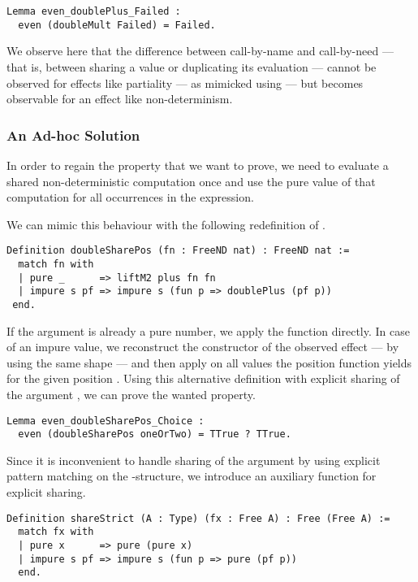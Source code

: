 \begin{verbatim}
Lemma even_doublePlus_Failed :
  even (doubleMult Failed) = Failed.
\end{verbatim}

We observe here that the difference between call\--by\--name and call\--by\--need --- that is, between sharing a value or duplicating its evaluation --- cannot be observed for effects like partiality --- as mimicked using  --- but becomes observable for an effect like non\--determinism.

\subsubsection{An Ad\--hoc Solution}
\label{subsubsec:adhoc}

In order to regain the property that we want to prove, we need to evaluate a shared non\--deterministic computation once and use the pure value of that computation for all occurrences in the expression.

We can mimic this behaviour with the following redefinition of .

\begin{verbatim}
Definition doubleSharePos (fn : FreeND nat) : FreeND nat :=
  match fn with
  | pure _      => liftM2 plus fn fn
  | impure s pf => impure s (fun p => doublePlus (pf p))
 end.
\end{verbatim}

If the argument  is already a pure number, we apply the function  directly.
In case of an impure value, we reconstruct the constructor of the observed effect --- by using the same shape  --- and then apply  on all values the position function  yields for the given position .
Using this alternative definition with explicit sharing of the argument , we can prove the wanted property.

\begin{verbatim}
Lemma even_doubleSharePos_Choice :
  even (doubleSharePos oneOrTwo) = TTrue ? TTrue.
\end{verbatim}

Since it is inconvenient to handle sharing of the argument  by using explicit pattern matching on the \--structure, we introduce an auxiliary function for explicit sharing.

\begin{verbatim}
Definition shareStrict (A : Type) (fx : Free A) : Free (Free A) :=
  match fx with
  | pure x      => pure (pure x)
  | impure s pf => impure s (fun p => pure (pf p))
  end.
\end{verbatim}

